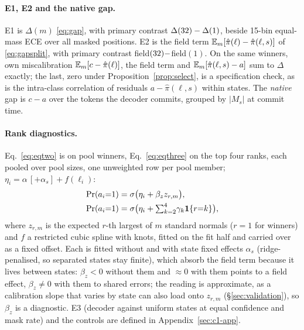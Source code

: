\paragraph{E1, E2 and the native gap.}
E1 is $\Delta(m)$ \eqref{eq:gap}, with primary contrast $\Delta(32)-\Delta(1)$,
beside 15-bin equal-mass ECE over all masked positions. E2 is the field
term $\mathbb{E}_m[\hat\pi(\ell)-\hat\pi(\ell,s)]$ of \eqref{eq:gapsplit}, with primary contrast
field$(32)-$field$(1)$. On the same winners, own miscalibration
$\mathbb{E}_m[c-\hat\pi(\ell)]$, the field term and $\mathbb{E}_m[\hat\pi(\ell,s)-a]$ sum to $\Delta$ exactly;
the last, zero under Proposition~\ref{prop:select}, is a specification check, as is the
intra-class correlation of residuals $a-\hat\pi(\ell,s)$ within states. The \emph{native} gap
is $c-a$ over the tokens the decoder commits, grouped by $|M_s|$ at commit time.

\paragraph{Rank diagnostics.}
Eq.~\ref{eq:eqtwo} is on pool winners, Eq.~\ref{eq:eqthree} on the top four ranks, each pooled over pool sizes, one unweighted row per pool member; $\eta_i=\alpha\,[+\alpha_s]+f(\ell_i)$:
\begin{align}
  \Pr(a_i{=}1) &= \sigma\bigl(\eta_i + \beta_z z_{r,m}\bigr), \label{eq:eqtwo}\\
  \Pr(a_i{=}1) &= \sigma\bigl(\eta_i + {\textstyle\sum_{k=2}^{4}}\gamma_k \mathbf{1}\{r{=}k\}\bigr),
  \label{eq:eqthree}
\end{align}
where $z_{r,m}$ is the expected $r$-th largest of $m$ standard normals ($r{=}1$ for winners) and $f$ a restricted
cubic spline with \VivaKnots{} knots, fitted on the fit half and
carried over as a fixed offset. Each is fitted without and with state fixed effects $\alpha_s$
(ridge-penalised, so separated states stay finite),
which absorb the field term because it lives between states: $\beta_z<0$ without them and
${\approx}0$ with them points to a field effect, $\beta_z\neq0$ with them to shared errors;
the reading is approximate, as a calibration slope that varies by state can also load onto
$z_{r,m}$ (\S\ref{sec:validation}), so $\beta_z$ is a diagnostic. E3 (decoder against uniform
states at equal confidence and mask rate) and the controls are defined in Appendix~\ref{sec:c1-app}.

